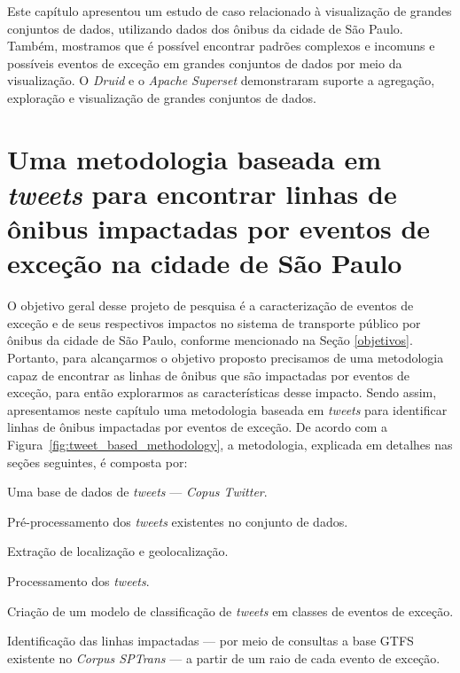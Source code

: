 \documentclass[
	12pt,				%
	oneside,			%
	a4paper,			%
	english,			%
	brazil				%
	]{abntex2ppgsi}
\begin{document}
{{{Este capítulo apresentou um estudo de caso relacionado à visualização de grandes conjuntos de dados, utilizando dados dos ônibus da cidade de São Paulo. Também, mostramos que é possível encontrar padrões complexos e incomuns e possíveis eventos de exceção em grandes conjuntos de dados por meio da visualização. O \textit{Druid} e o \textit{Apache Superset} demonstraram suporte a agregação, exploração e visualização de grandes conjuntos de dados. 


\chapter{Uma metodologia baseada em \textit{tweets} para encontrar linhas de ônibus impactadas por eventos de exceção na cidade de São Paulo}
\label{exp1}

O objetivo geral desse projeto de pesquisa é a caracterização de eventos de exceção e de seus respectivos impactos no sistema de transporte público por ônibus da cidade de São Paulo, conforme mencionado na Seção \ref{objetivos}. Portanto, para alcançarmos o objetivo proposto precisamos de uma metodologia capaz de encontrar as linhas de ônibus que são impactadas por eventos de exceção, para então explorarmos as características desse impacto. Sendo assim, apresentamos neste capítulo uma metodologia baseada em \textit{tweets} para identificar linhas de ônibus impactadas por eventos de exceção. De acordo com a Figura~\ref{fig:tweet_based_methodology}, a metodologia, explicada em detalhes nas seções seguintes, é composta por:

\begin{enumerate*}
\item Uma base de dados de \textit{tweets} --- \textit{Copus Twitter}.
\item Pré-processamento dos \textit{tweets} existentes no conjunto de dados.
\item Extração de localização e geolocalização.
\item Processamento dos \textit{tweets}.
\item Criação de um modelo de classificação de \textit{tweets} em classes de eventos de exceção.
\item Identificação das linhas impactadas --- por meio de consultas a base GTFS existente no \textit{Corpus SPTrans} --- a partir de um raio de cada evento de exceção.
\end{enumerate*}

}}}
\end{document}
